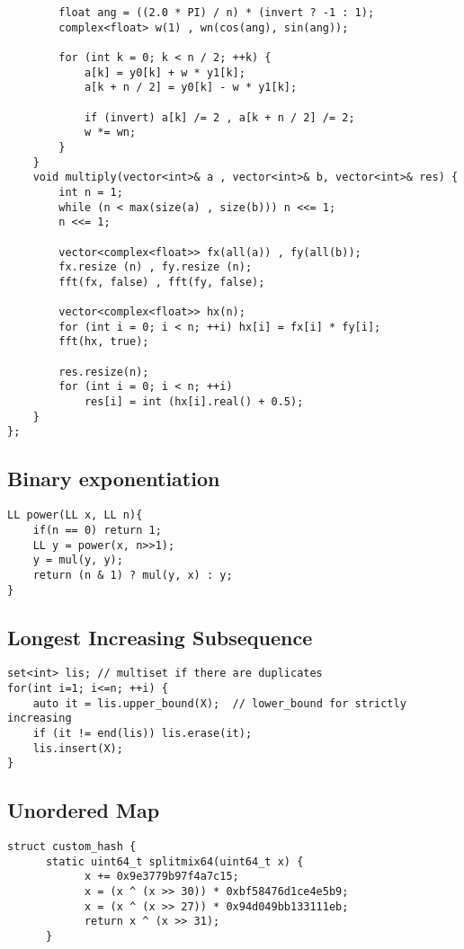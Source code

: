 \documentclass[12pt,a4paper,onesided]{article}
\begin{document}
\begin{multicols}{3}
\begin{lstlisting}
		float ang = ((2.0 * PI) / n) * (invert ? -1 : 1);
		complex<float> w(1) , wn(cos(ang), sin(ang));

		for (int k = 0; k < n / 2; ++k) {
			a[k] = y0[k] + w * y1[k];
			a[k + n / 2] = y0[k] - w * y1[k];

			if (invert) a[k] /= 2 , a[k + n / 2] /= 2;
			w *= wn;
		}
	}
	void multiply(vector<int>& a , vector<int>& b, vector<int>& res) {
		int n = 1;
		while (n < max(size(a) , size(b))) n <<= 1;
		n <<= 1;

		vector<complex<float>> fx(all(a)) , fy(all(b));
		fx.resize (n) , fy.resize (n);
		fft(fx, false) , fft(fy, false);

		vector<complex<float>> hx(n);
		for (int i = 0; i < n; ++i) hx[i] = fx[i] * fy[i];
		fft(hx, true);

		res.resize(n);
		for (int i = 0; i < n; ++i)
			res[i] = int (hx[i].real() + 0.5);
	}
};
\end{lstlisting}


\subsection{Binary exponentiation}
\begin{lstlisting}
LL power(LL x, LL n){
    if(n == 0) return 1;
    LL y = power(x, n>>1);
    y = mul(y, y);
    return (n & 1) ? mul(y, x) : y;
}

\end{lstlisting}


\subsection{Longest Increasing Subsequence}
\begin{lstlisting}
set<int> lis; // multiset if there are duplicates
for(int i=1; i<=n; ++i) {
	auto it = lis.upper_bound(X);  // lower_bound for strictly increasing
	if (it != end(lis)) lis.erase(it);
	lis.insert(X);
}
\end{lstlisting}


\subsection{Unordered Map}
\begin{lstlisting}
struct custom_hash {
      static uint64_t splitmix64(uint64_t x) {
            x += 0x9e3779b97f4a7c15;
            x = (x ^ (x >> 30)) * 0xbf58476d1ce4e5b9;
            x = (x ^ (x >> 27)) * 0x94d049bb133111eb;
            return x ^ (x >> 31);
      }


\end{lstlisting}
\end{multicols}
\end{document}
